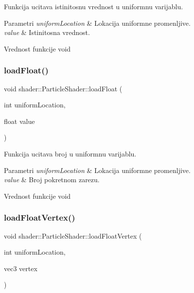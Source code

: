 Funkcija ucitava istinitosnu vrednost u uniformnu varijablu. 


\begin{DoxyParams}{Parametri}
{\em uniform\+Location} & Lokacija uniformne promenljive. \\
\hline
{\em value} & Istinitosna vrednost. \\
\hline
\end{DoxyParams}
\begin{DoxyReturn}{Vrednost funkcije}
void 
\end{DoxyReturn}
\mbox{\label{classshader_1_1ParticleShader_a55302fe993044f41bf046c7116fc1230}} 
\subsubsection{\texorpdfstring{load\+Float()}{loadFloat()}}
{\footnotesize\ttfamily void shader\+::\+Particle\+Shader\+::load\+Float (\begin{DoxyParamCaption}\item[{int}]{uniform\+Location,  }\item[{float}]{value }\end{DoxyParamCaption})}



Funkcija ucitava broj u uniformnu varijablu. 


\begin{DoxyParams}{Parametri}
{\em uniform\+Location} & Lokacija uniformne promenljive. \\
\hline
{\em value} & Broj pokretnom zarezu. \\
\hline
\end{DoxyParams}
\begin{DoxyReturn}{Vrednost funkcije}
void 
\end{DoxyReturn}
\mbox{\label{classshader_1_1ParticleShader_a1cf3a18c68299861cd2395fd6be99372}} 
\subsubsection{\texorpdfstring{load\+Float\+Vertex()}{loadFloatVertex()}}
{\footnotesize\ttfamily void shader\+::\+Particle\+Shader\+::load\+Float\+Vertex (\begin{DoxyParamCaption}\item[{int}]{uniform\+Location,  }\item[{vec3}]{vertex }\end{DoxyParamCaption})}



